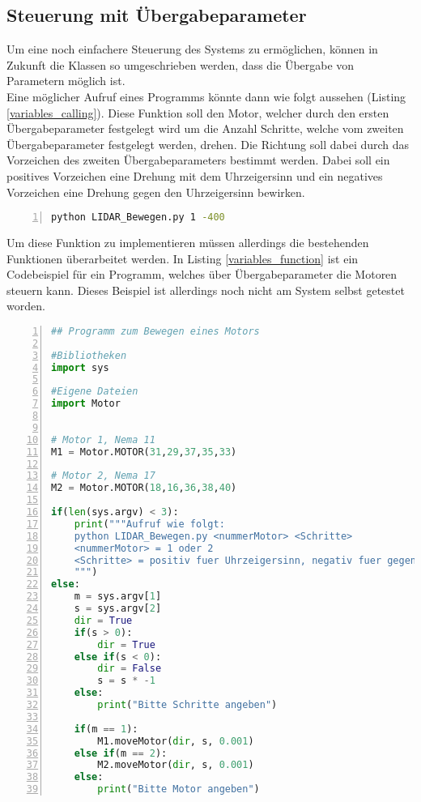 \subsection{Steuerung mit Übergabeparameter}
Um eine noch einfachere Steuerung des Systems zu ermöglichen, können in Zukunft die Klassen so umgeschrieben werden, dass die Übergabe von Parametern möglich ist.\\
Eine möglicher Aufruf eines Programms könnte dann wie folgt aussehen (Listing \ref{variables_calling}). Diese Funktion soll den Motor, welcher durch den ersten Übergabeparameter festgelegt wird um die Anzahl Schritte, welche vom zweiten Übergabeparameter festgelegt werden, drehen. Die Richtung soll dabei durch das Vorzeichen des zweiten Übergabeparameters bestimmt werden. Dabei soll ein positives Vorzeichen eine Drehung mit dem Uhrzeigersinn und ein negatives Vorzeichen eine Drehung gegen den Uhrzeigersinn bewirken.
\begin{lstlisting}[caption={Beispiel Aufruf einer Pythonfunktion mit Übergabeparametern}, language={bash}, label={variables_calling}, numbers=left]
python LIDAR_Bewegen.py 1 -400
\end{lstlisting}
Um diese Funktion zu implementieren müssen allerdings die bestehenden Funktionen überarbeitet werden. In Listing \ref{variables_function} ist ein Codebeispiel für ein Programm, welches über Übergabeparameter die Motoren steuern kann. Dieses Beispiel ist allerdings noch nicht am System selbst getestet worden. 
\begin{lstlisting}[caption={Python Beispielfunktion, welche Übergabeparamenter akzeptiert und ausführt}, language={python}, label={variables_function}, numbers=left]
## Programm zum Bewegen eines Motors

#Bibliotheken
import sys

#Eigene Dateien
import Motor


# Motor 1, Nema 11
M1 = Motor.MOTOR(31,29,37,35,33)

# Motor 2, Nema 17
M2 = Motor.MOTOR(18,16,36,38,40)

if(len(sys.argv) < 3):
    print("""Aufruf wie folgt:
    python LIDAR_Bewegen.py <nummerMotor> <Schritte>
    <nummerMotor> = 1 oder 2
    <Schritte> = positiv fuer Uhrzeigersinn, negativ fuer gegen den Uhrzeigersinn
    """)
else:
    m = sys.argv[1]
    s = sys.argv[2]
    dir = True
    if(s > 0):
        dir = True
    else if(s < 0):
        dir = False
        s = s * -1
    else:
        print("Bitte Schritte angeben")

    if(m == 1):
        M1.moveMotor(dir, s, 0.001)
    else if(m == 2):
        M2.moveMotor(dir, s, 0.001)
    else:
        print("Bitte Motor angeben")

\end{lstlisting}
